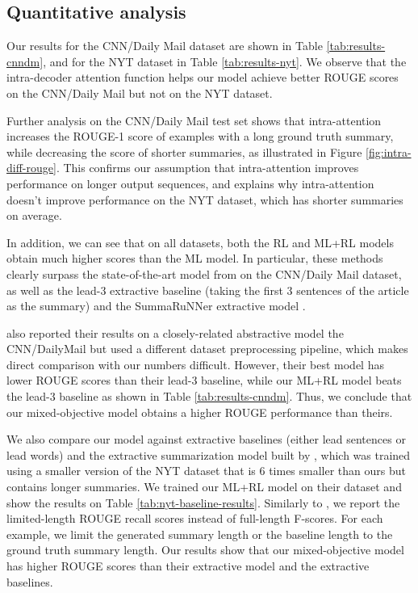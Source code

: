 \subsection{Quantitative analysis}

Our results for the CNN/Daily Mail dataset are shown in Table \ref{tab:results-cnndm}, and for the NYT dataset in Table \ref{tab:results-nyt}. We observe that the intra-decoder attention function helps our model achieve better ROUGE scores on the CNN/Daily Mail but not on the NYT dataset.

Further analysis on the CNN/Daily Mail test set shows that intra-attention increases the ROUGE-1 score of examples with a long ground truth summary, while decreasing the score of shorter summaries, as illustrated in Figure \ref{fig:intra-diff-rouge}. This confirms our assumption that intra-attention improves performance on longer output sequences, and explains why intra-attention doesn’t improve performance on the NYT dataset, which has shorter summaries on average.

In addition, we can see that on all datasets, both the RL and ML+RL models obtain much higher scores than the ML model. In particular, these methods clearly surpass the state-of-the-art model from \citet{nallapati2016} on the CNN/Daily Mail dataset, as well as the lead-3 extractive baseline (taking the first 3 sentences of the article as the summary) and the SummaRuNNer extractive model \citep{nallapati2017}.

\citet{see2017} also reported their results on a closely-related abstractive model the CNN/DailyMail but used a different dataset preprocessing pipeline, which makes direct comparison with our numbers difficult. However, their best model has lower ROUGE scores than their lead-3 baseline, while our ML+RL model beats the lead-3 baseline as shown in Table \ref{tab:results-cnndm}. Thus, we conclude that our mixed-objective model obtains a higher ROUGE performance than theirs.

We also compare our model against extractive baselines (either lead sentences or lead words) and the extractive summarization model built by \citet{durrett2016learning}, which was trained using a smaller version of the NYT dataset that is 6 times smaller than ours but contains longer summaries. We trained our ML+RL model on their dataset and show the results on Table \ref{tab:nyt-baseline-results}. Similarly to \citet{durrett2016learning}, we report the limited-length ROUGE recall scores instead of full-length F-scores. For each example, we limit the generated summary length or the baseline length to the ground truth summary length. Our results show that our mixed-objective model has higher ROUGE scores than their extractive model and the extractive baselines.

